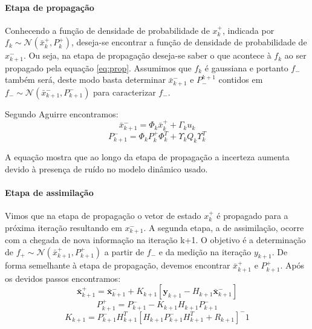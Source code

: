 \paragraph{Etapa de propagação}
Conhecendo a função de densidade de probabilidade de $x_k^+$, indicada por $f_k\sim \mathcal{N}(\bar{x}^+_k, P^+_k)$, deseja-se encontrar a função de densidade de probabilidade de $x^-_{k+1}$. Ou seja, na etapa de propagação deseja-se saber o que acontece à $f_k$ ao ser propagado pela equação \eqref{eq:prop}. Assumimos que $f_k$ é gaussiana e portanto $f_-$ também será, deste modo basta determinar $\bar{x}^-_{k+1}$ e $P_-^{k+1}$ contidos em $f_- \sim \mathcal{N}(\bar{x}^-_{k+1},P^-_{k+1})$ para caracterizar $f_-$.


Segundo Aguirre \cite{aguirre2015} encontramos:
\begin{equation}
\bar{x}^-_{k+1}=\Phi_k\bar{x}^+_k+\Gamma_ku_k
\end{equation}
\begin{equation}
P^-_{k+1}=\Phi_kP^+_k\Phi^T_k+\Upsilon_kQ_k\Upsilon^T_k
\end{equation}

A equação mostra que ao longo da etapa de propagação a incerteza aumenta devido à presença de ruído no modelo dinâmico usado.

\paragraph{Etapa de assimilação}
Vimos que na etapa de propagação o vetor de estado $x^+_k$ é propagado para a próxima iteração resultando em $x^-_{k+1}$. A segunda etapa, a de assimilação, ocorre com a chegada de nova informação na iteração k+1. O objetivo é a determinação de $f_+ \sim \mathcal{N} (\bar{x}^+_{k+1},P^+_{k+1})$ a partir de $f_-$ e da medição na iteração $y_{k+1}$. De forma semelhante à etapa de propagação, devemos encontrar $\bar{x}^+_{k+1}$ e $P^+_{k+1}$. Após os devidos passos encontramos:
\begin{equation}
\bar{\mathbf{x}}^+_{k+1}=\bar{\mathbf{x}}^-_{k+1}+K_{k+1}[\mathbf{y}_{k+1}-H_{k+1} \bar{\mathbf{x}} ^-_{k+1}]
\end{equation}
\begin{equation}
P^+_{k+1}=P^-_{k+1}-K_{k+1} H_{k+1} P^-_{k+1}
\end{equation}
\begin{equation}
K_{k+1}=P^-_{k+1} H^T_{k+1}[H_{k+1} P^-_{k+1} H^T_{k+1}+R_{k+1}]^-1
\end{equation}

